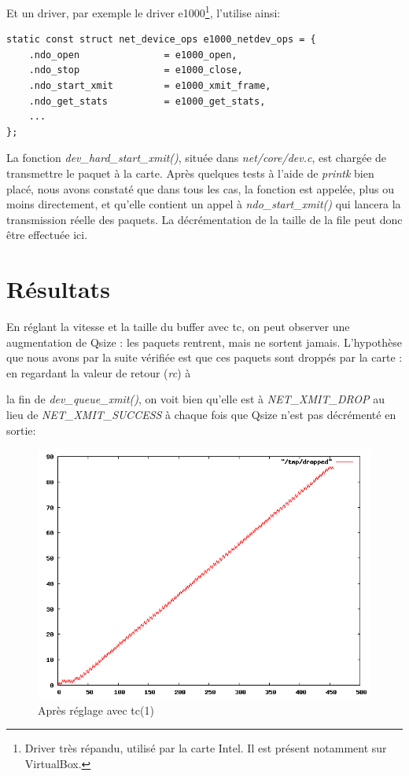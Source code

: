 \documentclass[a4paper]{article}
\begin{document}
Et un driver, par exemple le driver e1000\footnote{Driver très répandu,
utilisé par la carte Intel. Il est présent notamment sur VirtualBox.},
l'utilise ainsi:
\begin{verbatim}
static const struct net_device_ops e1000_netdev_ops = {
    .ndo_open               = e1000_open,
    .ndo_stop               = e1000_close,
    .ndo_start_xmit         = e1000_xmit_frame,
    .ndo_get_stats          = e1000_get_stats,
    ...
};
\end{verbatim}

La fonction \textit{dev\_hard\_start\_xmit()}, située dans
\textit{net/core/dev.c}, est chargée de transmettre le paquet
à la carte. Après quelques tests à l'aide de \textit{printk} bien
placé, nous avons constaté que dans tous les cas, la fonction
est appelée, plus ou moins directement, et qu'elle contient 
un appel à \textit{ndo\_start\_xmit()} qui lancera la transmission réelle des paquets. La décrémentation de la
taille de la file peut donc être effectuée ici.

\section{Résultats}
En réglant la vitesse et la taille du buffer avec tc, on peut observer
une augmentation de Qsize : les paquets rentrent, mais ne sortent jamais.
L'hypothèse que nous avons par la suite vérifiée est que ces paquets
sont droppés par la carte : en regardant la valeur de retour (\textit{rc}) à

la  fin de \textit{dev\_queue\_xmit()}, on voit bien  qu'elle est à
\textit{NET\_XMIT\_DROP} au lieu de \textit{NET\_XMIT\_SUCCESS} à chaque
fois que Qsize n'est pas décrémenté
en sortie:
\begin{figure}[!ht]
	\centering
	\includegraphics[scale=.5]{dropped.png}
	\caption{\label{dropped} Après réglage avec tc(1)}
\end{figure}
\end{document}
